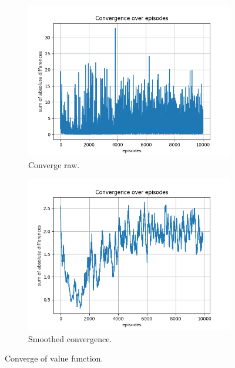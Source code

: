 \documentclass{assignment}
\begin{document}
\begin{figure}[H]
    \begin{subfigure}{0.5\textwidth}
        \includegraphics[width=\textwidth]{figures/convergence_q/epsilon_sweep/convergence_Q_alpha_0.1_gamma_0.95_epislon_1.0.png}
    \caption{Converge raw.}
    \end{subfigure}\hfill
    \begin{subfigure}{0.5\textwidth}
        \includegraphics[width=\textwidth]{figures/convergence_q/epsilon_sweep/convergence_Q_smoothed_alpha_0.1_gamma_0.95_epislon_1.0.png}
    \caption{Smoothed convergence.}
    \end{subfigure}
    \caption{Converge of value function.}
    \label{fig:epsilon_1.0_q_learning_convergence}
\end{figure}
\end{document}
